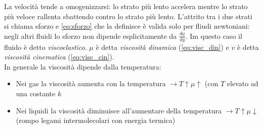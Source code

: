   La velocità tende a omogenizzarsi: lo strato più lento accelera mentre lo strato più veloce rallenta sbattendo contro lo strato più lento.
  L'attrito tra i due strati si chiama sforzo e \cref{eq:sforzo} che la definisce è valida solo per fliudi newtoniani: negli altri fluidi lo sforzo non dipende esplicitamente da $ \frac{d \underline{u}}{dy} $. Im questo caso il fluido è detto \emph{viscoelastico}.
  $ \mu  $ è detta \emph{viscosità dinamica} (\cref{eq:visc_din}) e $ v $ è detta \emph{viscosità cinematica} (\cref{eq:visc_cin}).\\
  In generale la viscosità dipende dalla temperatura:
  \begin{itemize}
  \item Nei gas la viscosità aumenta con la temperatura $ \to T\uparrow \mu\uparrow$ (con $ T $ elevato ad una costante $ k $    
  \item Nei liquidi la viscosità diminuisce all'aumentare della temperatura $ \to T\uparrow \mu\downarrow  $ (rompo legami intermolecolari con energia termica) 
  \end{itemize}
  
